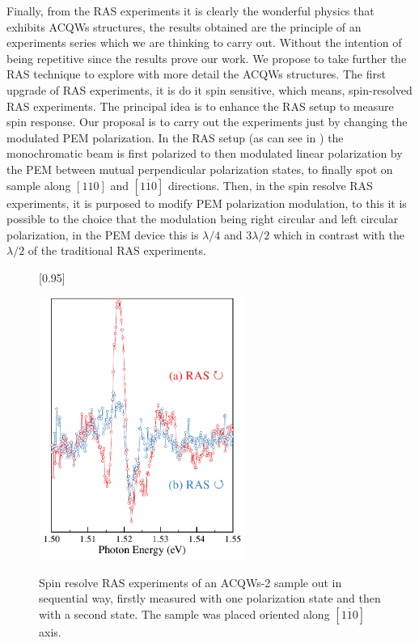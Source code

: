 Finally, from the \gls{RAS} experiments it is clearly the wonderful physics that exhibits \gls{ACQWs}
structures, the results obtained are the principle of an experiments series which we are
thinking to carry out. Without the intention of being repetitive since the results prove our work. We propose to take further the RAS technique to explore with more detail the \gls{ACQWs} structures. The first upgrade of RAS experiments, it is do it spin sensitive, which means, spin-resolved RAS experiments.
The principal idea is to enhance the RAS setup to measure spin response. Our proposal is to carry out the experiments just by changing the modulated PEM polarization. In the RAS setup (as can see in ) the monochromatic beam is first polarized to then modulated linear polarization by the PEM between mutual perpendicular polarization states, to finally spot on sample along  $[110]$ and $[1\overline{1}0]$  directions. Then, in the spin resolve \gls{RAS} experiments, it is purposed to modify PEM polarization modulation, to this it is possible
to the choice that the modulation being right circular and left circular polarization, in the
PEM device this is $\lambda/4$ and $3\lambda/2$ which in contrast with the $\lambda/2$ of the traditional RAS
experiments.
\begin{figure}[H]
	[0.95\FBwidth]
	{ \caption{ 
		Spin resolve RAS experiments of an ACQWs-2 sample out in sequential way, firstly measured with one polarization state and then with a second state. The sample was placed oriented  along $[1\overline{1}0]$ axis.
	}
	\label{fig:chapter-4-subsec-conclusion-ras-spin-1}}
	{
	\includegraphics[width=0.6\textwidth]{../figures/chapter-4/ras-spin/out/ras-spin-1.pdf}
	}
\end{figure}
